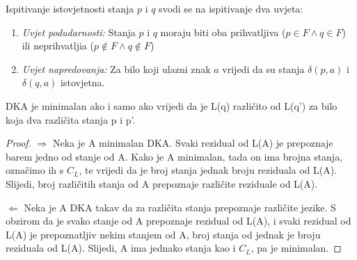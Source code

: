 \documentclass[titlepage]{article}
\begin{document}
Ispitivanje istovjetnosti stanja $p$ i $q$ svodi se na ispitivanje dva uvjeta: 
\begin{enumerate}
\item \textit{Uvjet podudarnosti:} Stanja $p$ i $q$ moraju biti oba prihvatljiva ($p \in F \wedge q \in F$) ili neprihvatljia  ($p \notin F \wedge q \notin F$)
\item \textit{Uvjet napredovanja:} Za bilo koji ulazni znak $a$ vrijedi da su stanja $\delta(p,a)$ i $\delta(q,a)$ istovjetna.
\end{enumerate}
\begin{corollary}DKA je minimalan ako i samo ako vrijedi da je L(q) različito od L(q') za bilo koja dva različita stanja p i p'. \end{corollary}
\begin{proof}
$\Rightarrow$ Neka je A minimalan DKA. Svaki rezidual od L(A) je prepoznaje barem jedno od stanje od A. Kako je A minimalan, tada on ima brojna stanja, označimo ih s $C_L$, te vrijedi da je broj stanja jednak broju reziduala od L(A). Slijedi, broj različitih stanja od A prepoznaje različite reziduale od L(A).


$\Leftarrow$ Neka je A DKA takav da za različita stanja prepoznaje različite jezike. S obzirom da je svako stanje od A prepoznaje rezidual od L(A), i svaki rezidual od L(A) je prepoznatljiv nekim stanjem od A, broj stanja od jednak je broju reziduala od L(A). Slijedi, A ima jednako stanja kao i $C_L$, pa je minimalan.

\end{proof}
\end{document}
